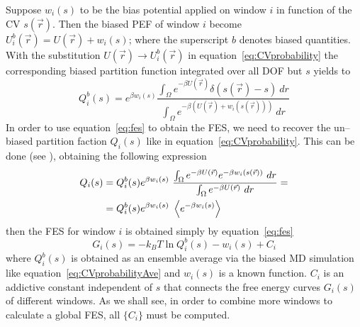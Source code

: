 Suppose $w_i(s)$ to be the bias potential applied on window $i$ in function of the \ac{CV} $s(\vec r)$. Then the
biased \ac{PEF} of window $i$ become $U_i^b(\vec r) = U(\vec r) + w_i(s)$; where the superscript $b$ denotes
biased quantities. With the substitution $U(\vec r) \rightarrow U_i^b(\vec r)$ in
equation~\eqref{eq:CVprobability} the corresponding biased partition function integrated over all \ac{DOF} but
$s$ yields to
\begin{equation*}
	Q_i^b(s) = e^{\beta w_i(s)}\frac{ \int_\Omega e^{-\beta U(\vec r)}\delta(s(\vec r) - s)\ dr }{\int_\Omega e^{-\beta (U(\vec r) + w_i(s(\vec r)))}\ dr}%
\end{equation*}
In order to use equation~\eqref{eq:fes} to obtain the \ac{FES}, we need to recover the un--biased partition
faction $Q_i(s)$ like in equation~\eqref{eq:CVprobability}. This can be done (see \cite{Umbrella}), obtaining the
following expression
\begin{equation}
	\begin{aligned}
	Q_i(s) &= Q_i^b(s) e^{\beta w_i(s)}\ \frac{ \int_\Omega e^{-\beta U(\vec r)}e^{-\beta w_i(s(\vec r))}\ dr }{\int_\Omega e^{-\beta U(\vec r)}\ dr} = \\%
		   &= Q_i^b(s) e^{\beta w_i(s)}\ \ave{e^{-\beta w_i(s)}}
	\end{aligned}
	\label{eq:windowPartFunc}
\end{equation}
then the \ac{FES} for window $i$ is obtained simply by equation~\eqref{eq:fes}
\begin{equation*}
	G_i(s) = -k_BT \ln Q_i^b(s) - w_i(s) + C_i
\end{equation*}
where $Q_i^b(s)$ is obtained as an ensemble average via the biased \ac{MD} simulation like
equation~\eqref{eq:CVprobabilityAve} and $w_i(s)$ is a known function. $C_i$ is an addictive constant independent
of $s$ that connects the free energy curves $G_i(s)$ of different windows. As we shall see, in order to combine
more windows to calculate a global \ac{FES}, all $\{C_i\}$ must be computed.

